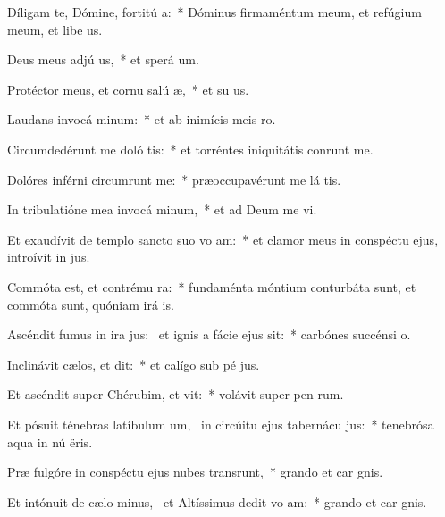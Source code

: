 \item Díligam te, Dómine, fortitú a:~* Dóminus firmaméntum meum, et refúgium meum, et libe us.
\item Deus meus adjú us,~* et sperá  um.
\item Protéctor meus, et cornu salú æ,~* et su us.
\item Laudans invocá minum:~* et ab inimícis meis  ro.
\item Circumdedérunt me doló tis:~* et torréntes iniquitátis conrunt me.
\item Dolóres inférni circumrunt me:~* præoccupavérunt me lá tis.
\item In tribulatióne mea invocá minum,~* et ad Deum me vi.
\item Et exaudívit de templo sancto suo vo am:~* et clamor meus in conspéctu ejus, introívit in  jus.
\item Commóta est, et contrému ra:~* fundaménta móntium conturbáta sunt, et commóta sunt, quóniam irá  is.
\item Ascéndit fumus in ira jus:~\pscross{} et ignis a fácie ejus sit:~* carbónes succénsi   o.
\item Inclinávit cælos, et dit:~* et calígo sub pé jus.
\item Et ascéndit super Chérubim, et vit:~* volávit super pen rum.
\item Et pósuit ténebras latíbulum um,~\pscross{} in circúitu ejus tabernácu jus:~* tenebrósa aqua in nú ëris.
\item Præ fulgóre in conspéctu ejus nubes transrunt,~* grando et car gnis.
\item Et intónuit de cælo minus,~\pscross{} et Altíssimus dedit vo am:~* grando et car gnis.

